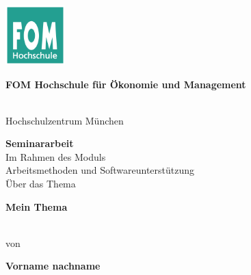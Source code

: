 \newcommand{\Thema}{Mein Thema}
\newcommand{\Name}{Vorname nachname}
\newcommand{\Gutachter}{Dr. Herbert Bauer}
\newcommand{\Matrikelnummer}{123456}
\newcommand{\Abgabedatum}{09.01.2022}




\begin{titlepage}
	\begin{center}
		\includegraphics[width=2.3cm]{assets/fomLogo.pdf}\\
		\vspace{.5cm}
		\begin{Large}\textbf{FOM Hochschule für Ökonomie und Management}\end{Large}\\
		\vspace{.5cm}
		Hochschulzentrum München
																														
		\vspace{2cm}
	\end{center}
																												
	\bigskip	
																																																				
	\begin{center}
		\textbf{Seminararbeit}\\
		\vspace{0.2cm}
		Im Rahmen des Moduls\\
		\vspace{0.5cm}
		Arbeitsmethoden und Softwareunterstützung\\
		\vspace{2cm}
		Über das Thema\\
		\vspace{0.5cm}
		\begin{Large}\textbf{\textbf{\Thema}}\end{Large}\\
																												
		\vspace{2cm}
		von\\
		\vspace{0.5cm}
		\begin{Large}\textbf{\textbf{\Name}}\end{Large}\\
	\end{center}
																										

\end{titlepage}
